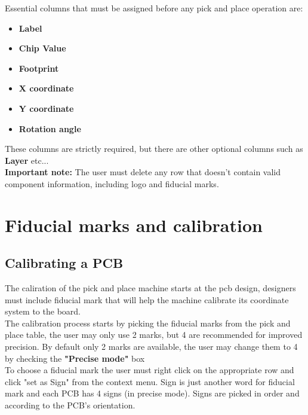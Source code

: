 \documentclass[a4paper,10pt]{report}
\begin{document}
\newpage
Essential columns that must be assigned before any pick and place operation are:
\begin{itemize}
 \item \textbf{Label}
 \item \textbf{Chip Value}
 \item \textbf{Footprint}
 \item \textbf{X coordinate}
 \item \textbf{Y coordinate}
 \item \textbf{Rotation angle}
\end{itemize}
These columns are strictly required, but there are other optional columns such as \textbf{Layer} etc...\\
\textbf{Important note: } The user must delete any row that doesn't contain valid component information, including logo and fiducial marks.\\
\newpage
\section{Fiducial marks and calibration}
\subsection{Calibrating a PCB}
The caliration of the pick and place machine starts at the pcb design, designers must include fiducial mark that will help the machine calibrate its coordinate system to the board.\\

The calibration process starts by picking the fiducial marks from the pick and place table, the user may only use 2 marks, but 4 are recommended for improved precision. By default only 2 marks are available, the user may change them to 4 by checking the \textbf{"Precise mode"} box\\

To choose a fiducial mark the user must right click on the appropriate row and click "set as Sign" from the context menu. Sign is just another word for fiducial mark and each PCB has 4 signs (in precise mode). Signs are picked in order and according to the PCB's orientation.\\
\end{document}
